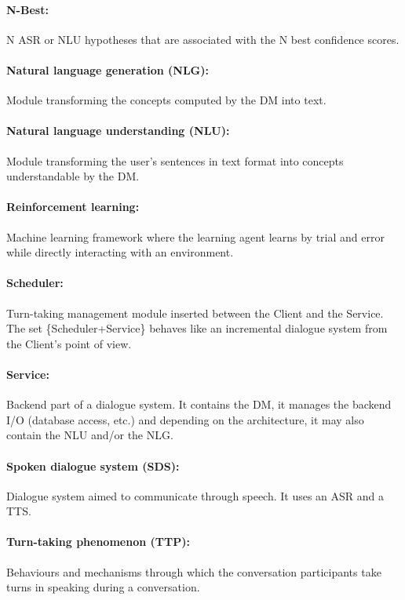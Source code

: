 \paragraph{N-Best:} N ASR or NLU hypotheses that are associated with the N best confidence scores.

\paragraph{Natural language generation (NLG):} Module transforming the concepts computed by the DM into text.

\paragraph{Natural language understanding (NLU):} Module transforming the user's sentences in text format into concepts understandable by the DM.

\paragraph{Reinforcement learning:} Machine learning framework where the learning agent learns by trial and error while directly interacting with an environment.

\paragraph{Scheduler:} Turn-taking management module inserted between the Client and the Service. The set \{Scheduler+Service\} behaves like an incremental dialogue system from the Client's point of view.

\paragraph{Service:} Backend part of a dialogue system. It contains the DM, it manages the backend I/O (database access, etc.) and depending on the architecture, it may also contain the NLU and/or the NLG.

\paragraph{Spoken dialogue system (SDS):} Dialogue system aimed to communicate through speech. It uses an ASR and a TTS.

\paragraph{Turn-taking phenomenon (TTP):} Behaviours and mechanisms through which the conversation participants take turns in speaking during a conversation.

